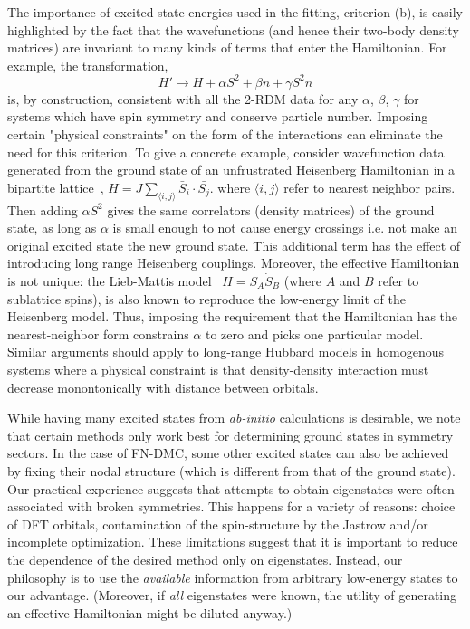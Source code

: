 \documentclass[prl,12pt,onecolumn,nofootinbib,notitlepage,english,superscriptaddress]{revtex4-1}
\newcommand{\HJC}[1]{{\color{RED}{\bf HJC: #1}}}
\begin{document}
The importance of excited state energies 
used in the fitting, criterion (b), is easily highlighted by the fact that 
the wavefunctions (and hence their two-body density matrices) 
are invariant to many kinds of terms that enter the Hamiltonian.
For example, the transformation, 
\begin{equation}
	H' \rightarrow H + \alpha S^2 + \beta n + \gamma S^2 n 
\end{equation}
is, by construction, consistent with all the 2-RDM data 
for any $\alpha$, $\beta$, $\gamma$ 
for systems which have spin symmetry and conserve particle number.
Imposing certain "physical constraints" on the form of the 
interactions can eliminate the need for this criterion. 
To give a concrete example, consider wavefunction data 
generated from the ground state of an unfrustrated 
Heisenberg Hamiltonian in a bipartite lattice~\HJC{A bipartite 
lattice is one with two sublattices $A$ and $B$ with 
only $A-B$ connections but no $A-A$ or $B-B$ ones.}, 
$ H = J \sum_{\langle i,j \rangle}\bar{S}_i \cdot \bar{S_j}.$ 
where $\langle i,j \rangle$ refer to nearest neighbor pairs.
Then adding $\alpha S^2$ gives the same correlators (density matrices) 
of the ground state, as long as $\alpha$ is small enough to not cause 
energy crossings i.e. not make an original 
excited state the new ground state. This additional 
term has the effect of introducing long range Heisenberg couplings. 
Moreover, the effective Hamiltonian is not unique: 
the Lieb-Mattis model~\cite{LM} $H = S_A \dot S_B$ 
(where $A$ and $B$ refer to sublattice spins), is also 
known to reproduce the low-energy limit of the Heisenberg model. 
Thus, imposing the requirement that the Hamiltonian has the 
nearest-neighbor form constrains $\alpha$ to zero and picks 
one particular model. Similar arguments should 
apply to long-range Hubbard models in homogenous 
systems where a physical constraint is that density-density 
interaction must decrease monontonically with distance between orbitals. 

While having many excited states from \emph{ab-initio} calculations 
is desirable, we note that certain methods only work best for 
determining ground states in symmetry sectors. 
In the case of FN-DMC, 
some other excited states can also be achieved by fixing their 
nodal structure (which is different from that of the ground state). 
Our practical experience suggests that attempts to obtain 
eigenstates were often associated with broken symmetries. 
This happens for a variety of reasons: choice of DFT orbitals, 
contamination of the spin-structure by the 
Jastrow and/or incomplete optimization. 
These limitations suggest that it is 
important to reduce the dependence of the desired 
method only on eigenstates. Instead, our philosophy is to 
use the \emph{available} information from arbitrary 
low-energy states to our advantage. 
(Moreover, if \emph{all} eigenstates were known, the utility of 
generating an effective Hamiltonian might be diluted anyway.)
  
\end{document}
